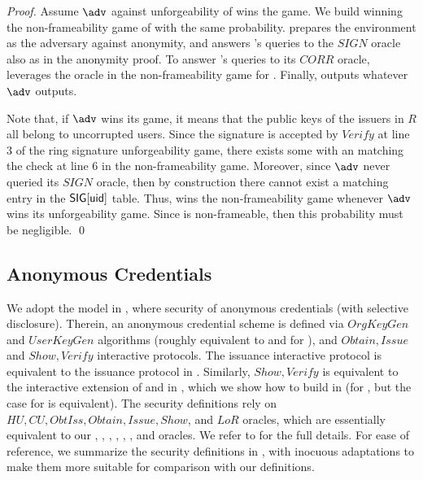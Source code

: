 \begin{proof}
  Assume $\adv$ against unforgeability of \CUASRing wins the game. We build
  \advB winning the non-frameability game of \CUASGen with the same probability.
  \advB prepares the environment as the adversary \advB against anonymity,
  and answers \adv's queries to the $SIGN$ oracle also as in the anonymity
  proof. To answer \adv's queries to its $CORR$ oracle, \advB leverages the
  \ICORR oracle in the non-frameability game for \UAS. Finally, \advB outputs
  whatever $\adv$ outputs.

  Note that, if $\adv$ wins its game, it means that the public keys of the
  issuers in $R$ all belong to uncorrupted users. Since the signature is
  accepted by $Verify$ at line 3 of the ring signature unforgeability game,
  there exists some \uid with an \usk matching the check at line 6 in the
  non-frameability game. Moreover, since $\adv$ never queried its $SIGN$
  oracle, then by construction there cannot exist a matching entry in the
  $\mathsf{SIG}[\mathsf{uid}]$ table. Thus, \advB wins the non-frameability game whenever
  $\adv$ wins its unforgeability game. Since \CUASGen is non-frameable, then
  this probability must be negligible.
  \qed
\end{proof}

\subsection{Anonymous Credentials}
\label{sapp:related-models-ac}

We adopt the model in \cite{fhs19}, where security of anonymous credentials
(with selective disclosure). Therein, an anonymous credential scheme is
defined via $OrgKeyGen$ and $UserKeyGen$ algorithms (roughly equivalent to
\IKeyGen and \UKeyGen for \UAS), and $Obtain,Issue$ and $Show,Verify$
interactive protocols. The issuance interactive protocol is equivalent to
the issuance protocol in \UAS. Similarly, $Show,Verify$ is equivalent to
the interactive extension of \Sign and \Verify in \UAS, which we show how
to build in  (for \GSAC, but the case for \UAS is
equivalent). The security definitions rely on $HU, CU, ObtIss, Obtain, Issue,
Show$, and $LoR$ oracles, which are essentially equivalent to our \HUGEN,
\CUGEN, \OBTISS, \OBTAIN, \ISSUE, \SIGN, and \CHALb oracles. We refer to
\cite{fhs19} for the full details. For ease of reference, we summarize the
security definitions in \cite{fig:model-ac}, with inocuous adaptations to
make them more suitable for comparison with our definitions.

